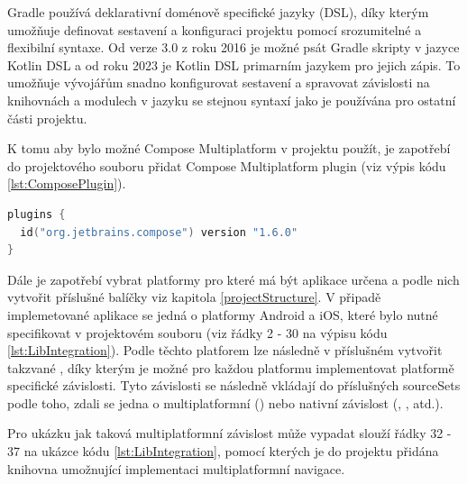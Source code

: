 Gradle používá deklarativní doménově specifické jazyky (DSL), díky kterým umožňuje definovat sestavení a konfiguraci projektu pomocí srozumitelné
a flexibilní syntaxe. Od verze 3.0 z roku 2016 je možné psát Gradle skripty v jazyce Kotlin DSL a od roku 2023 je Kotlin DSL primarním jazykem 
pro jejich zápis. To umožňuje vývojářům snadno konfigurovat sestavení a spravovat závislosti na knihovnách a modulech v jazyku se stejnou
syntaxí jako je používána pro ostatní části projektu.


K tomu aby bylo možné Compose Multiplatform v projektu použít, je zapotřebí do projektového souboru  přidat Compose 
Multiplatform plugin (viz výpis kódu \ref{lst:ComposePlugin}).

\begin{lstlisting}[caption={Integrace Compose Multiplatform pluginu do sestavovacího scriptu}, label={lst:ComposePlugin}, language=Kotlin]
plugins {
  id("org.jetbrains.compose") version "1.6.0"
}
\end{lstlisting}

Dále je zapotřebí vybrat platformy pro které má být aplikace určena a podle nich vytvořit příslušné balíčky viz kapitola \ref{projectStructure}.
V připadě implemetované aplikace se jedná o platformy Android a iOS, které bylo nutné specifikovat v projektovém souboru 
 (viz řádky 2 - 30 na výpisu kódu \ref{lst:LibIntegration}).
Podle těchto platforem lze následně v příslušném  vytvořit takzvané , díky kterým je možné
pro každou platformu implementovat platformě specifické závislosti. Tyto závislosti se následně vkládají do příslušných
sourceSets podle toho, zdali se jedna o multiplatformní () nebo nativní závislost (, , atd.).

Pro ukázku jak taková multiplatformní závislost může vypadat slouží řádky 32 - 37 na ukázce kódu \ref{lst:LibIntegration}, pomocí 
kterých je do projektu přidána knihovna umožnující implementaci multiplatformní navigace.

